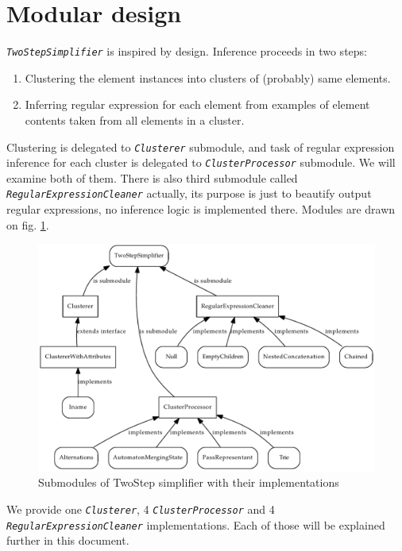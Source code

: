 \documentclass[a4paper,10pt,oneside]{article}
\newcommand{\myscale}{0.74}
\newcommand{\jmodule}[1]{\texttt{\textit{#1}}}
\begin{document}
\section{Modular design}
\jmodule{TwoStepSimplifier} is inspired by \cite{1802522} design. Inference proceeds in two steps:
\begin{enumerate}
	\item Clustering the element instances into clusters of (probably) same elements.
	\item Inferring regular expression for each element from examples of element contents taken from all elements in a cluster.
\end{enumerate}
Clustering is delegated to \jmodule{Clusterer} submodule, and task of regular expression inference for each cluster is delegated to \jmodule{ClusterProcessor} submodule. We will examine both of them.
There is also third submodule called \jmodule{RegularExpressionCleaner} actually, its purpose is just to beautify
 output regular expressions, no inference logic is implemented there. 
Modules are drawn on fig. \ref{twostep_modules}.
\begin{figure}[tpb]
	\centering\includegraphics[scale=\myscale]{twostep_modules}
	\caption{Submodules of TwoStep simplifier with their implementations} \label{twostep_modules}
\end{figure}
We provide one \jmodule{Clusterer}, 4 \jmodule{ClusterProcessor} and 4 \jmodule{RegularExpressionCleaner} implementations.
Each of those will be explained further in this document.
\end{document}
